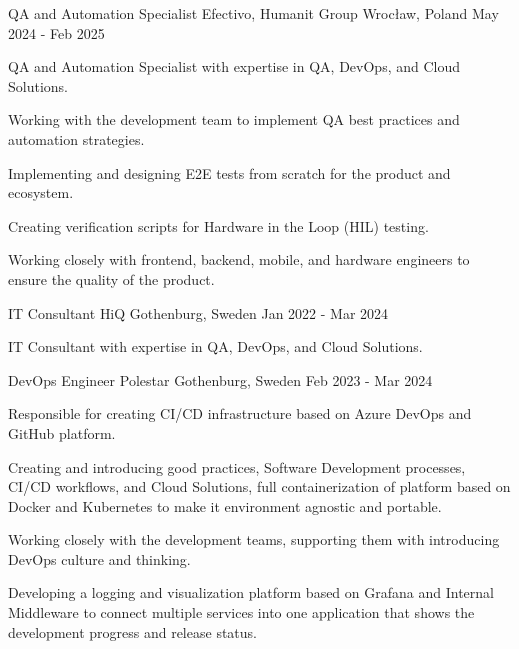 \begin{cventries}
  \cventry
  {QA and Automation Specialist} %
  {Efectivo, Humanit Group} %
  {Wrocław, Poland} %
  {May 2024 - Feb 2025} %
  {
    \begin{cvitems}
      \item {QA and Automation Specialist with expertise in QA, DevOps, and Cloud Solutions.}
      \item {Working with the development team to implement QA best practices and automation strategies.}
      \item {Implementing and designing E2E tests from scratch for the product and ecosystem.}
      \item {Creating verification scripts for Hardware in the Loop (HIL) testing.}
      \item {Working closely with frontend, backend, mobile, and hardware engineers to ensure the quality of the product.}
    \end{cvitems}
  }

  \cventry
  {IT Consultant} %
  {HiQ} %
  {Gothenburg, Sweden} %
  {Jan 2022 - Mar 2024} %
  {
    \begin{cvitems}
      \item {IT Consultant with expertise in QA, DevOps, and Cloud Solutions.}
    \end{cvitems}
  }

  \cventry
  {DevOps Engineer} %
  {Polestar} %
  {Gothenburg, Sweden} %
  {Feb 2023 - Mar 2024} %
  {
    \begin{cvitems} %
      \item {Responsible for creating CI/CD infrastructure based on Azure DevOps and GitHub platform.}
      \item {Creating and introducing good practices, Software Development processes, CI/CD workflows, and Cloud Solutions, full containerization of platform based on Docker and Kubernetes to make it environment agnostic and portable.}
      \item {Working closely with the development teams, supporting them with introducing DevOps culture and thinking.}
      \item {Developing a logging and visualization platform based on Grafana and Internal Middleware to connect multiple services into one application that shows the development progress and release status.}
    \end{cvitems}
  }


\end{cventries}
